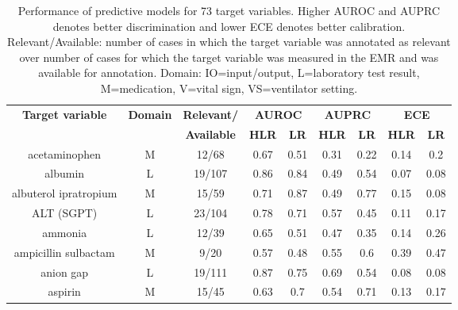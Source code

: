 \begin{scriptsize}
\begin{center}
\setlength{\aboverulesep}{0.1pt}
    \setlength{\belowrulesep}{0.1pt}
    \renewcommand{\arraystretch}{1.2}
    \setcounter{table}{0} \renewcommand{\thetable}{A\arabic{table}}
\begin{longtable}{|ccc|c|c|c|c|c|c|}
    \caption{Performance of predictive models for 73 target variables. Higher AUROC and AUPRC denotes better discrimination and lower ECE denotes better calibration. Relevant/Available: number of cases in which the target variable was annotated as relevant over number of cases for which the target variable was measured in the EMR and was available for annotation. Domain: IO=input/output, L=laboratory test result, M=medication, V=vital sign, VS=ventilator setting.} \label{tab:s1}\\
\toprule
\multicolumn{1}{|c|}{\multirow{2}[4]{*}{\textbf{Target variable}}} & \multicolumn{1}{c|}{\multirow{2}[4]{*}{\textbf{Domain}}} & \textbf{Relevant/} & \multicolumn{2}{c|}{\textbf{AUROC}} & \multicolumn{2}{c|}{\textbf{AUPRC}} & \multicolumn{2}{c|}{\textbf{ECE}} \\
\cmidrule{4-9}\multicolumn{1}{|c|}{} & \multicolumn{1}{c|}{} & \textbf{Available} & \textbf{HLR} & \textbf{LR} & \textbf{HLR} & \textbf{LR} & \textbf{HLR} & \textbf{LR} \\
\midrule
\multicolumn{1}{|c|}{acetaminophen} & \multicolumn{1}{c|}{M} & 12/68 & 0.67  & 0.51  & 0.31  & 0.22  & 0.14  & 0.2 \\
\midrule
\multicolumn{1}{|c|}{albumin} & \multicolumn{1}{c|}{L} & 19/107 & 0.86  & 0.84  & 0.49  & 0.54  & 0.07  & 0.08 \\
\midrule
\multicolumn{1}{|c|}{albuterol ipratropium} & \multicolumn{1}{c|}{M} & 15/59 & 0.71  & 0.87  & 0.49  & 0.77  & 0.15  & 0.08 \\
\midrule
\multicolumn{1}{|c|}{ALT (SGPT)} & \multicolumn{1}{c|}{L} & 23/104 & 0.78  & 0.71  & 0.57  & 0.45  & 0.11  & 0.17 \\
\midrule
\multicolumn{1}{|c|}{ammonia} & \multicolumn{1}{c|}{L} & 12/39 & 0.65  & 0.51  & 0.47  & 0.35  & 0.14  & 0.26 \\
\midrule
\multicolumn{1}{|c|}{ampicillin sulbactam} & \multicolumn{1}{c|}{M} & 9/20 & 0.57  & 0.48  & 0.55  & 0.6   & 0.39  & 0.47 \\
\midrule
\multicolumn{1}{|c|}{anion gap} & \multicolumn{1}{c|}{L} & 19/111 & 0.87  & 0.75  & 0.69  & 0.54  & 0.08  & 0.08 \\
\midrule
\multicolumn{1}{|c|}{aspirin} & \multicolumn{1}{c|}{M} & 15/45 & 0.63  & 0.7   & 0.54  & 0.71  & 0.13  & 0.17 \\

\end{longtable}
\end{center}
\end{scriptsize}
